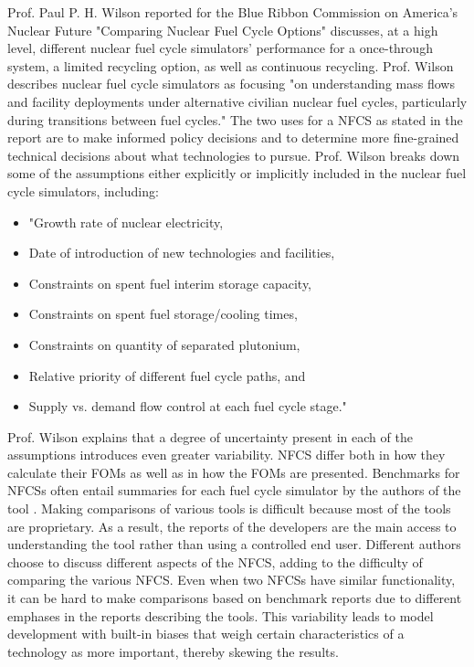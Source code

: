\documentclass[12pt]{UIdahoMastersThesis}
\begin{document}
Prof. Paul P. H. Wilson reported for the Blue Ribbon Commission on America's Nuclear Future "Comparing Nuclear Fuel Cycle Options" discusses, at a high level, different nuclear fuel cycle simulators' performance for a once-through system, a limited recycling option, as well as continuous recycling. Prof. Wilson describes nuclear fuel cycle simulators as focusing "on understanding mass flows and facility deployments under alternative civilian nuclear fuel cycles, particularly during transitions between fuel cycles." The two uses for a NFCS as stated in the report are to make informed policy decisions and to determine more fine-grained technical decisions about what technologies to pursue. Prof. Wilson breaks down some of the assumptions either explicitly or implicitly included in the nuclear fuel cycle simulators, including:
\begin{itemize}
\item "Growth rate of nuclear electricity,
\item Date of introduction of new technologies and facilities,
\item Constraints on spent fuel interim storage capacity,
\item Constraints on spent fuel storage/cooling times,
\item Constraints on quantity of separated plutonium,
\item Relative priority of different fuel cycle paths, and
\item Supply vs. demand flow control at each fuel cycle stage."
\end{itemize}

Prof. Wilson explains that a degree of uncertainty present in each of the assumptions introduces even greater variability. NFCS differ both in how they calculate their FOMs as well as in how the FOMs are presented. Benchmarks for NFCSs often entail summaries for each fuel cycle simulator by the authors of the tool \cite{Guerin2009}. Making comparisons of various tools is difficult because most of the tools are proprietary. As a result, the reports of the developers are the main access to understanding the tool rather than using a controlled end user. Different authors choose to discuss different aspects of the NFCS, adding to the difficulty of comparing the various NFCS. Even when two NFCSs have similar functionality, it can be hard to make comparisons based on benchmark reports due to different emphases in the reports describing the tools. This variability leads to model development with built-in biases that weigh certain characteristics of a technology as more important, thereby skewing the results.
\end{document}
